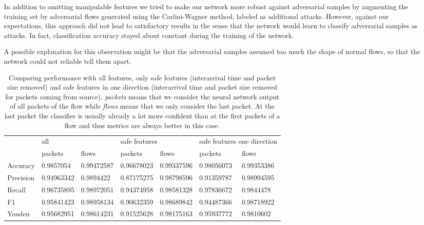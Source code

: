 \documentclass[sigconf,nonacm]{acmart}
\begin{document}
In addition to omitting manipulable features we tried to make our network more robust against adversarial samples by augmenting the training set by adversarial flows generated using the Carlini-Wagner method, labeled as additional attacks. However, against our expectations, this approach did not lead to satisfactory results in the sense that the network would learn to classify adversarial samples as attacks. In fact, classification accuracy stayed about constant during the training of the network.

A possible explanation for this observation might be that the adversarial samples assumed too much the shape of normal flows, so that the network could not reliable tell them apart.

\begin{table}
\caption{Comparing performance with all features, only safe features (interarrival time and packet size removed) and safe features in one direction (interarrival time and packet size removed for packets coming from source). \textit{packets} means that we consider the neural network output of all packets of the flow while \textit{flows} means that we only consider the last packet. At the last packet the classifier is usually already a lot more confident than at the first packets of a flow and thus metrics are always better in this case.}  \label{tab:performance_results_no_manipulable}
\newcommand{\cmidrulespace}{6pt}
\begin{tabular}{l l l l l l l} \toprule
& \multicolumn{2}{l}{all} & \multicolumn{2}{l}{safe features} & \multicolumn{2}{l}{safe features one direction} \\
\cmidrule(r){2-3} \cmidrule(lr){4-5} \cmidrule(l){6-7}
& packets & flows & packets & flows & packets & flows \\
\midrule
Accuracy & 0.9857054 & 0.99472587 & 0.96678023 & 0.99337596 & 0.98056073 & 0.99353386 \\
Precision & 0.94963342 & 0.9894422 & 0.87175275 & 0.98798596 & 0.91359787 & 0.98994595 \\
Recall & 0.96735895 & 0.98972051 & 0.94374958 & 0.98581328 & 0.97836672 & 0.9844478 \\
F1 & 0.95841423 & 0.98958134 & 0.90632359 & 0.98689842 & 0.94487366 & 0.98718922 \\
Youden & 0.95682951 & 0.98614231 & 0.91525628 & 0.98175163 & 0.95937772 & 0.9810602 \\
\bottomrule
\end{tabular}
\end{table}
\end{document}
